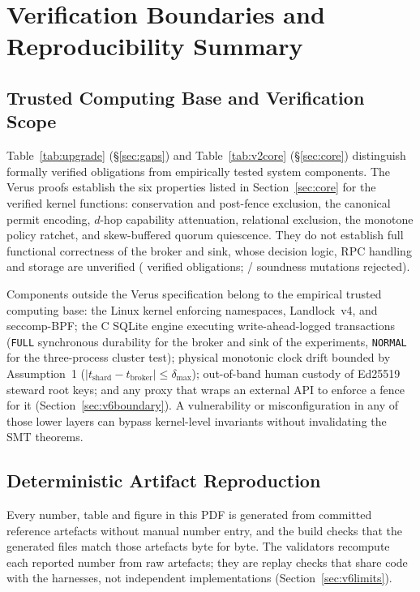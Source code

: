 \section{Verification Boundaries and Reproducibility Summary}\label{app:repro}

\subsection{Trusted Computing Base and Verification Scope}

Table~\ref{tab:upgrade} (\S\ref{sec:gaps}) and Table~\ref{tab:v2core} (\S\ref{sec:core}) distinguish formally verified obligations from empirically tested system components. The Verus proofs establish the six properties listed in Section~\ref{sec:core} for the verified kernel functions: conservation and post-fence exclusion, the canonical permit encoding, \(d\)-hop capability attenuation, relational exclusion, the monotone policy ratchet, and skew-buffered quorum quiescence. They do not establish full functional correctness of the broker and sink, whose decision logic, RPC handling and storage are unverified (\VTwoProofs{} verified obligations; \VFiveProofMutationsRejected/\VFiveProofMutationsRejected{} soundness mutations rejected).

Components outside the Verus specification belong to the empirical trusted computing base: the Linux kernel enforcing namespaces, Landlock~v4, and seccomp-BPF; the C SQLite engine executing write-ahead-logged transactions (\texttt{FULL} synchronous durability for the broker and sink of the experiments, \texttt{NORMAL} for the three-process cluster test); physical monotonic clock drift bounded by Assumption~1 (\(|t_{\mathrm{shard}} - t_{\mathrm{broker}}| \le \delta_{\max}\)); out-of-band human custody of Ed25519 steward root keys; and any proxy that wraps an external API to enforce a fence for it (Section~\ref{sec:v6boundary}). A vulnerability or misconfiguration in any of those lower layers can bypass kernel-level invariants without invalidating the SMT theorems.

\subsection{Deterministic Artifact Reproduction}

Every number, table and figure in this PDF is generated from committed reference artefacts without manual number entry, and the build checks that the generated files match those artefacts byte for byte. The validators recompute each reported number from raw artefacts; they are replay checks that share code with the harnesses, not independent implementations (Section~\ref{sec:v6limits}).
